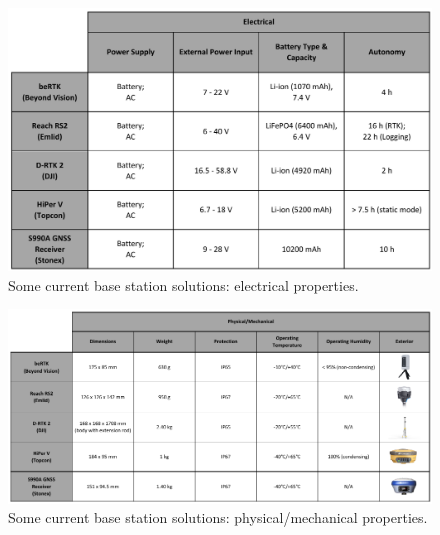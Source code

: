 \begin{figure}[h]
	\centering
	\includegraphics[width=1.0\textwidth]{Chapters/Figures/curr_solutions/ELECTRICAL_v2.pdf}
	\caption{Some current base station solutions: electrical properties.}
	\label{fig:curr_sol_ELECTRICAL}
\end{figure}

\begin{figure}[h]
	\centering
	\includegraphics[width=1.0\textwidth]{Chapters/Figures/curr_solutions/MECH_v2.pdf}
	\caption{Some current base station solutions: physical/mechanical properties.}
	\label{fig:curr_sol_MECH}
\end{figure}

